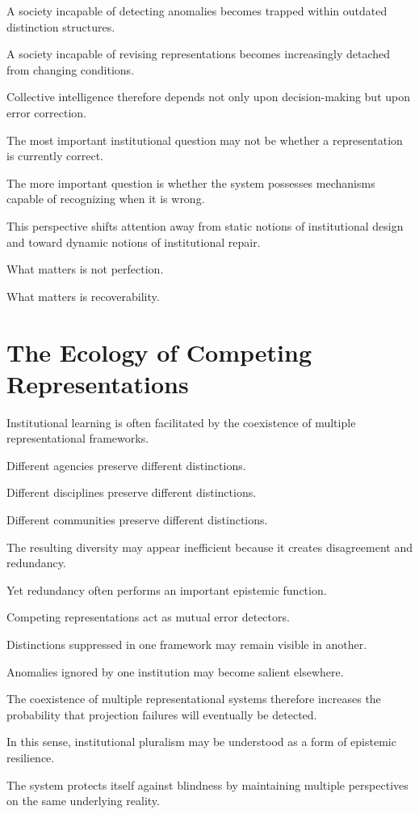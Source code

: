 \documentclass[11pt,oneside,openany]{book}
\begin{document}
A society incapable of detecting anomalies becomes trapped within outdated distinction structures.

A society incapable of revising representations becomes increasingly detached from changing conditions.

Collective intelligence therefore depends not only upon decision-making but upon error correction.

The most important institutional question may not be whether a representation is currently correct.

The more important question is whether the system possesses mechanisms capable of recognizing when it is wrong.

This perspective shifts attention away from static notions of institutional design and toward dynamic notions of institutional repair.

What matters is not perfection.

What matters is recoverability.

\section{The Ecology of Competing Representations}

Institutional learning is often facilitated by the coexistence of multiple representational frameworks.

Different agencies preserve different distinctions.

Different disciplines preserve different distinctions.

Different communities preserve different distinctions.

The resulting diversity may appear inefficient because it creates disagreement and redundancy.

Yet redundancy often performs an important epistemic function.

Competing representations act as mutual error detectors.

Distinctions suppressed in one framework may remain visible in another.

Anomalies ignored by one institution may become salient elsewhere.

The coexistence of multiple representational systems therefore increases the probability that projection failures will eventually be detected.

In this sense, institutional pluralism may be understood as a form of epistemic resilience.

The system protects itself against blindness by maintaining multiple perspectives on the same underlying reality.
\end{document}
